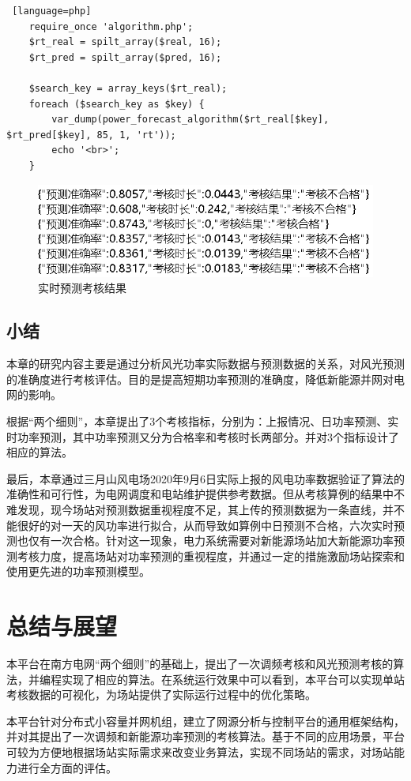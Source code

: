 \documentclass[winfonts,UTF8,a4paper]{ctexart}
\begin{document}
\begin{lstlisting} [language=php]
	require_once 'algorithm.php';
	$rt_real = spilt_array($real, 16);
	$rt_pred = spilt_array($pred, 16);
	
	$search_key = array_keys($rt_real);
	foreach ($search_key as $key) {
		var_dump(power_forecast_algorithm($rt_real[$key], $rt_pred[$key], 85, 1, 'rt'));
		echo '<br>';
	}
\end{lstlisting}
\begin{figure}[H]
	\centering
	\includegraphics[width=0.7\linewidth]{pic/screenshot007}
	\caption{实时预测考核结果}
	\label{fig:screenshot007}
\end{figure}

\subsection{小结}
本章的研究内容主要是通过分析风光功率实际数据与预测数据的关系，对风光预测的准确度进行考核评估。目的是提高短期功率预测的准确度，降低新能源并网对电网的影响。

根据“两个细则”，本章提出了3个考核指标，分别为：上报情况、日功率预测、实时功率预测，其中功率预测又分为合格率和考核时长两部分。并对3个指标设计了相应的算法。

最后，本章通过三月山风电场2020年9月6日实际上报的风电功率数据验证了算法的准确性和可行性，为电网调度和电站维护提供参考数据。但从考核算例的结果中不难发现，现今场站对预测数据重视程度不足，其上传的预测数据为一条直线，并不能很好的对一天的风功率进行拟合，从而导致如算例中日预测不合格，六次实时预测也仅有一次合格。针对这一现象，电力系统需要对新能源场站加大新能源功率预测考核力度，提高场站对功率预测的重视程度，并通过一定的措施激励场站探索和使用更先进的功率预测模型。

\newpage
\section{总结与展望}

本平台在南方电网“两个细则”的基础上，提出了一次调频考核和风光预测考核的算法，并编程实现了相应的算法。在系统运行效果中可以看到，本平台可以实现单站考核数据的可视化，为场站提供了实际运行过程中的优化策略。

本平台针对分布式小容量并网机组，建立了网源分析与控制平台的通用框架结构，并对其提出了一次调频和新能源功率预测的考核算法。基于不同的应用场景，平台可较为方便地根据场站实际需求来改变业务算法，实现不同场站的需求，对场站能力进行全方面的评估。
\end{document}
